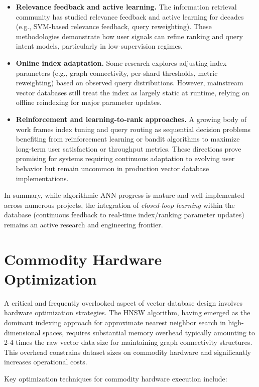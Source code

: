 \begin{itemize}
    \item \textbf{Relevance feedback and active learning.} The information retrieval community has studied relevance feedback and active learning for decades (e.g., SVM-based relevance feedback, query reweighting). These methodologies demonstrate how user signals can refine ranking and query intent models, particularly in low-supervision regimes.
    
    \item \textbf{Online index adaptation.} Some research explores adjusting index parameters (e.g., graph connectivity, per-shard thresholds, metric reweighting) based on observed query distributions. However, mainstream vector databases still treat the index as largely static at runtime, relying on offline reindexing for major parameter updates.
    
    \item \textbf{Reinforcement and learning-to-rank approaches.} A growing body of work frames index tuning and query routing as sequential decision problems benefiting from reinforcement learning or bandit algorithms to maximize long-term user satisfaction or throughput metrics. These directions prove promising for systems requiring continuous adaptation to evolving user behavior but remain uncommon in production vector database implementations.
\end{itemize}

In summary, while algorithmic ANN progress is mature and well-implemented across numerous projects, the integration of \textit{closed-loop learning} within the database (continuous feedback to real-time index/ranking parameter updates) remains an active research and engineering frontier.

\section{Commodity Hardware Optimization}
A critical and frequently overlooked aspect of vector database design involves hardware optimization strategies. The HNSW algorithm, having emerged as the dominant indexing approach for approximate nearest neighbor search in high-dimensional spaces, requires substantial memory overhead typically amounting to 2-4 times the raw vector data size for maintaining graph connectivity structures. This overhead constrains dataset sizes on commodity hardware and significantly increases operational costs.

Key optimization techniques for commodity hardware execution include:

